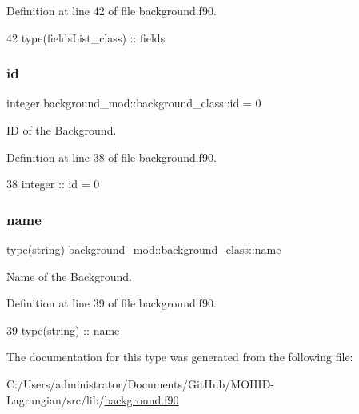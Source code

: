Definition at line 42 of file background.\+f90.


\begin{DoxyCode}
42         \textcolor{keywordtype}{type}(fieldsList\_class) :: fields
\end{DoxyCode}
\mbox{\label{structbackground__mod_1_1background__class_a1b3eabdda94ffdb97b6bb0db385edfd8}} 
\subsubsection{\texorpdfstring{id}{id}}
{\footnotesize\ttfamily integer background\+\_\+mod\+::background\+\_\+class\+::id = 0\hspace{0.3cm}{\ttfamily [private]}}



ID of the Background. 



Definition at line 38 of file background.\+f90.


\begin{DoxyCode}
38         \textcolor{keywordtype}{integer} :: id = 0
\end{DoxyCode}
\mbox{\label{structbackground__mod_1_1background__class_a4f812fd2adfe5d1e50db63e75e460022}} 
\subsubsection{\texorpdfstring{name}{name}}
{\footnotesize\ttfamily type(string) background\+\_\+mod\+::background\+\_\+class\+::name\hspace{0.3cm}{\ttfamily [private]}}



Name of the Background. 



Definition at line 39 of file background.\+f90.


\begin{DoxyCode}
39         \textcolor{keywordtype}{type}(string) :: name
\end{DoxyCode}


The documentation for this type was generated from the following file\+:\begin{DoxyCompactItemize}
\item 
C\+:/\+Users/administrator/\+Documents/\+Git\+Hub/\+M\+O\+H\+I\+D-\/\+Lagrangian/src/lib/\mbox{\hyperlink{background_8f90}{background.\+f90}}\end{DoxyCompactItemize}
